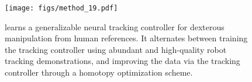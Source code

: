 \begin{figure}[h]
  \centering
  \vspace{-10pt}
  \texttt{[image: figs/method\_19.pdf]}
  \vspace{-20pt}
  \caption{\footnotesize
  \href{https://projectwebsite7.github.io/gene-dex-manip/}{\modelname}learns a generalizable neural tracking controller for dexterous manipulation from human references. It alternates between training the tracking controller using abundant and high-quality robot tracking demonstrations, and improving the data
  via the tracking controller through a homotopy optimization scheme.
}
\end{figure}

